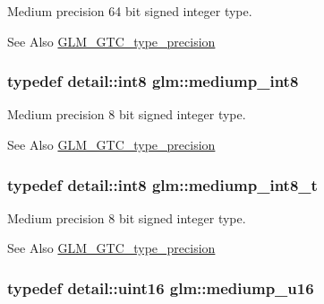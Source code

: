Medium precision 64 bit signed integer type. \begin{DoxySeeAlso}{See Also}
\hyperlink{group__gtc__type__precision}{G\-L\-M\-\_\-\-G\-T\-C\-\_\-type\-\_\-precision} 
\end{DoxySeeAlso}
\hypertarget{group__gtc__type__precision_ga3ee8faab2278c44c5785af04b7b18a14}{
\subsubsection[{mediump\-\_\-int8}]{\setlength{\rightskip}{0pt plus 5cm}typedef detail\-::int8 {\bf glm\-::mediump\-\_\-int8}}}\label{group__gtc__type__precision_ga3ee8faab2278c44c5785af04b7b18a14}
Medium precision 8 bit signed integer type. \begin{DoxySeeAlso}{See Also}
\hyperlink{group__gtc__type__precision}{G\-L\-M\-\_\-\-G\-T\-C\-\_\-type\-\_\-precision} 
\end{DoxySeeAlso}
\hypertarget{group__gtc__type__precision_ga626ac5f73d3538e62a879d6c56abfb36}{
\subsubsection[{mediump\-\_\-int8\-\_\-t}]{\setlength{\rightskip}{0pt plus 5cm}typedef detail\-::int8 {\bf glm\-::mediump\-\_\-int8\-\_\-t}}}\label{group__gtc__type__precision_ga626ac5f73d3538e62a879d6c56abfb36}
Medium precision 8 bit signed integer type. \begin{DoxySeeAlso}{See Also}
\hyperlink{group__gtc__type__precision}{G\-L\-M\-\_\-\-G\-T\-C\-\_\-type\-\_\-precision} 
\end{DoxySeeAlso}
\hypertarget{group__gtc__type__precision_ga6745262ef6a6fdb8637b2387ef924828}{
\subsubsection[{mediump\-\_\-u16}]{\setlength{\rightskip}{0pt plus 5cm}typedef detail\-::uint16 {\bf glm\-::mediump\-\_\-u16}}}\label{group__gtc__type__precision_ga6745262ef6a6fdb8637b2387ef924828}
